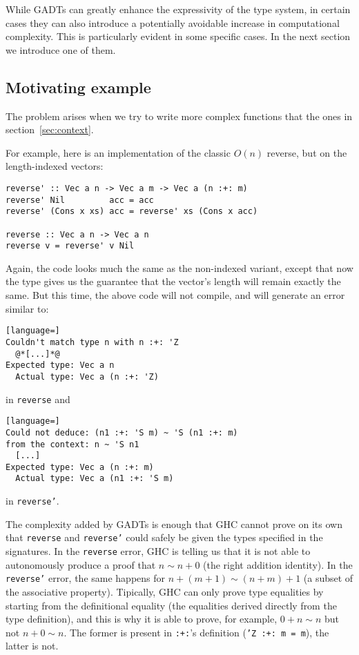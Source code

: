 While GADTs can greatly enhance the expressivity of the type system, in certain cases they can also introduce a potentially avoidable increase in computational complexity.
This is particularly evident in some specific cases.
In the next section we introduce one of them.

\subsection{Motivating example}
\label{subsec:motivating-example}

The problem arises when we try to write more complex functions that the ones in section~\ref{sec:context}.

For example, here is an implementation of the classic $O(n)$ reverse, but on the length-indexed vectors:

\begin{lstlisting}
reverse' :: Vec a n -> Vec a m -> Vec a (n :+: m)
reverse' Nil         acc = acc
reverse' (Cons x xs) acc = reverse' xs (Cons x acc)

reverse :: Vec a n -> Vec a n
reverse v = reverse' v Nil
\end{lstlisting}

Again, the code looks much the same as the non-indexed variant, except that now the type gives us the guarantee that the vector's length will remain exactly the same.
But this time, the above code will not compile, and will generate an error similar to:

\begin{lstlisting}[language=]
Couldn't match type n with n :+: 'Z
  @*[...]*@
Expected type: Vec a n
  Actual type: Vec a (n :+: 'Z)
\end{lstlisting}

in \texttt{reverse} and

\begin{lstlisting}[language=]
Could not deduce: (n1 :+: 'S m) ~ 'S (n1 :+: m)
from the context: n ~ 'S n1
  [...]
Expected type: Vec a (n :+: m)
  Actual type: Vec a (n1 :+: 'S m)
\end{lstlisting}

in \texttt{reverse'}.

The complexity added by GADTs is enough that GHC cannot prove on its own that \texttt{reverse} and \texttt{reverse'} could safely be given the types specified in the signatures.
In the \texttt{reverse} error, GHC is telling us that it is not able to autonomously produce a proof that $n \sim n+0$ (the right addition identity).
In the \texttt{reverse'} error, the same happens for $n+(m+1) \sim (n+m)+1$ (a subset of the associative property).
Tipically, GHC can only prove type equalities by starting from the definitional equality (the equalities derived directly from the type definition), and this is why it is able to prove, for example, $0+n \sim n$ but not $n+0 \sim n$. The former is present in \texttt{:+:}'s definition (\texttt{'Z :+: m = m}), the latter is not.

